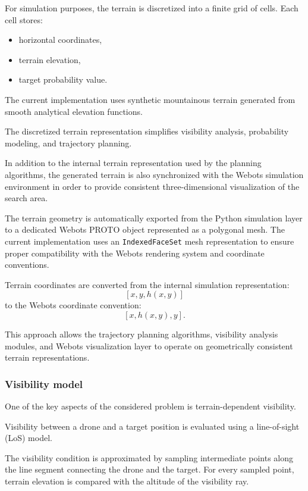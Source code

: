 \documentclass[english]{projectreport}
\begin{document}
For simulation purposes, the terrain is discretized into a finite grid of cells. Each cell stores:
\begin{itemize}
    \item horizontal coordinates,
    \item terrain elevation,
    \item target probability value.
\end{itemize}

The current implementation uses synthetic mountainous terrain generated from smooth analytical elevation functions.

The discretized terrain representation simplifies visibility analysis, probability modeling, and trajectory planning.

In addition to the internal terrain representation used by the planning algorithms, the generated terrain is also synchronized with the Webots simulation environment in order to provide consistent three-dimensional visualization of the search area.

The terrain geometry is automatically exported from the Python simulation layer to a dedicated Webots PROTO object represented as a polygonal mesh. The current implementation uses an \texttt{IndexedFaceSet} mesh representation to ensure proper compatibility with the Webots rendering system and coordinate conventions.

Terrain coordinates are converted from the internal simulation representation:
\[
[x, y, h(x,y)]
\]
to the Webots coordinate convention:
\[
[x, h(x,y), y].
\]

This approach allows the trajectory planning algorithms, visibility analysis modules, and Webots visualization layer to operate on geometrically consistent terrain representations.

\subsubsection{Visibility model}

One of the key aspects of the considered problem is terrain-dependent visibility.

Visibility between a drone and a target position is evaluated using a line-of-sight (LoS) model.

The visibility condition is approximated by sampling intermediate points along the line segment connecting the drone and the target. For every sampled point, terrain elevation is compared with the altitude of the visibility ray.
\end{document}
